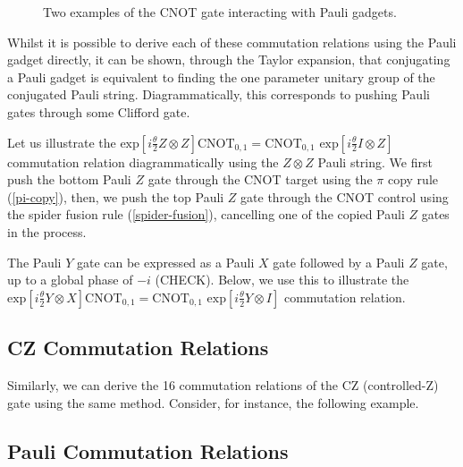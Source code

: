 \begin{figure}[H]
    \centering
    \caption{Two examples of the CNOT gate interacting with Pauli gadgets.}
\end{figure}

Whilst it is possible to derive each of these commutation relations using the Pauli gadget directly, it can be shown, through the Taylor expansion, that conjugating a Pauli gadget is equivalent to finding the one parameter unitary group of the conjugated Pauli string. Diagrammatically, this corresponds to pushing Pauli gates through some Clifford gate.

Let us illustrate the $\text{exp} \left[ i\frac{\theta}{2} Z \otimes Z \right] \text{CNOT}_{0, 1} = \text{CNOT}_{0, 1} \,\, \text{exp} \left[ i\frac{\theta}{2} I \otimes Z \right]$ commutation relation diagrammatically using the $Z \otimes Z$ Pauli string. We first push the bottom Pauli $Z$ gate through the CNOT target using the $\pi$ copy rule (\ref{pi-copy}), then, we push the top Pauli $Z$ gate through the CNOT control using the spider fusion rule (\ref{spider-fusion}), cancelling one of the copied Pauli $Z$ gates in the process.


The Pauli $Y$ gate can be expressed as a Pauli $X$ gate followed by a Pauli $Z$ gate, up to a global phase of $-i$ (CHECK). Below, we use this to illustrate the $\text{exp} \left[ i\frac{\theta}{2} Y \otimes X \right] \text{CNOT}_{0, 1} = \text{CNOT}_{0, 1} \,\, \text{exp} \left[ i\frac{\theta}{2} Y \otimes I \right]$ commutation relation.



\subsection{CZ Commutation Relations}

Similarly, we can derive the 16 commutation relations of the CZ (controlled-Z) gate using the same method. Consider, for instance, the following example.


\subsection{Pauli Commutation Relations}

